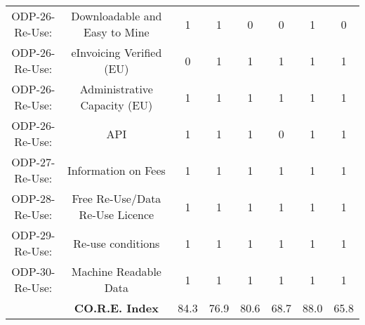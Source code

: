 \documentclass[a4paper, twoside]{report}
\begin{document}
\begin{table}[htbp]
\begin{adjustbox}{max width=\linewidth}
\begin{tabular}{rccccccc}
    \midrule
    \multicolumn{1}{c}{ODP-26-Re-Use:} & \multicolumn{1}{p{19em}}{Downloadable and Easy to Mine} & 1     & 1     & 0     & 0     & 1     & 0 \\
    \multicolumn{1}{c}{ODP-26-Re-Use:} & \multicolumn{1}{p{19em}}{\cellcolor[rgb]{ .749,  .749,  .749}eInvoicing Verified (EU)} & \cellcolor[rgb]{ .749,  .749,  .749}0 & \cellcolor[rgb]{ .749,  .749,  .749}1 & \cellcolor[rgb]{ .749,  .749,  .749}1 & \cellcolor[rgb]{ .749,  .749,  .749}1 & \cellcolor[rgb]{ .749,  .749,  .749}1 & \cellcolor[rgb]{ .749,  .749,  .749}1 \\
    \multicolumn{1}{c}{ODP-26-Re-Use:} & \multicolumn{1}{p{19em}}{Administrative Capacity (EU)} & 1     & 1     & 1     & 1     & 1     & 1 \\
    \multicolumn{1}{c}{ODP-26-Re-Use:} & \multicolumn{1}{p{19em}}{API} & 1     & 1     & 1     & 0     & 1     & 1 \\
    \multicolumn{1}{c}{ODP-27-Re-Use:} & \multicolumn{1}{p{19em}}{\cellcolor[rgb]{ .749,  .749,  .749}Information on Fees} & \cellcolor[rgb]{ .749,  .749,  .749}1 & \cellcolor[rgb]{ .749,  .749,  .749}1 & \cellcolor[rgb]{ .749,  .749,  .749}1 & \cellcolor[rgb]{ .749,  .749,  .749}1 & \cellcolor[rgb]{ .749,  .749,  .749}1 & \cellcolor[rgb]{ .749,  .749,  .749}1 \\
    \multicolumn{1}{c}{ODP-28-Re-Use:} & \multicolumn{1}{p{19em}}{\cellcolor[rgb]{ .749,  .749,  .749}Free Re-Use/Data Re-Use Licence} & \cellcolor[rgb]{ .749,  .749,  .749}1 & \cellcolor[rgb]{ .749,  .749,  .749}1 & \cellcolor[rgb]{ .749,  .749,  .749}1 & \cellcolor[rgb]{ .749,  .749,  .749}1 & \cellcolor[rgb]{ .749,  .749,  .749}1 & \cellcolor[rgb]{ .749,  .749,  .749}1 \\
    \multicolumn{1}{c}{ODP-29-Re-Use:} & \multicolumn{1}{p{19em}}{\cellcolor[rgb]{ .749,  .749,  .749}Re-use conditions} & \cellcolor[rgb]{ .749,  .749,  .749}1 & \cellcolor[rgb]{ .749,  .749,  .749}1 & \cellcolor[rgb]{ .749,  .749,  .749}1 & \cellcolor[rgb]{ .749,  .749,  .749}1 & \cellcolor[rgb]{ .749,  .749,  .749}1 & \cellcolor[rgb]{ .749,  .749,  .749}1 \\
    \multicolumn{1}{c}{ODP-30-Re-Use:} & \multicolumn{1}{p{19em}}{\cellcolor[rgb]{ .749,  .749,  .749}Machine Readable Data} & \cellcolor[rgb]{ .749,  .749,  .749}1 & \cellcolor[rgb]{ .749,  .749,  .749}1 & \cellcolor[rgb]{ .749,  .749,  .749}1 & \cellcolor[rgb]{ .749,  .749,  .749}1 & \cellcolor[rgb]{ .749,  .749,  .749}1 & \cellcolor[rgb]{ .749,  .749,  .749}1 \\
    \midrule
          & \textbf{CO.R.E. Index} & 84.3  & 76.9  & 80.6  & 68.7  & 88.0  & 65.8 \\
    \end{tabular}%

    \end{adjustbox}
  \label{tab:score_final4}%
\end{table}%
\end{document}
